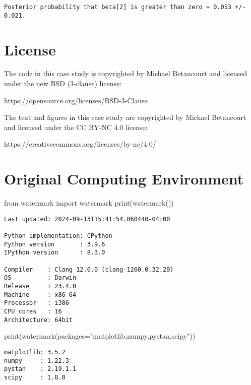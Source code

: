 \documentclass[
  letterpaper,
  DIV=11,
  numbers=noendperiod]{scrartcl}
\newenvironment{Shaded}{\begin{snugshade}}{\end{snugshade}}
\newcommand{\BuiltInTok}[1]{\textcolor[rgb]{0.00,0.23,0.31}{#1}}
\newcommand{\ImportTok}[1]{\textcolor[rgb]{0.00,0.46,0.62}{#1}}
\newcommand{\NormalTok}[1]{\textcolor[rgb]{0.00,0.23,0.31}{#1}}
\newcommand{\OperatorTok}[1]{\textcolor[rgb]{0.37,0.37,0.37}{#1}}
\newcommand{\StringTok}[1]{\textcolor[rgb]{0.13,0.47,0.30}{#1}}
\begin{document}
\begin{verbatim}
Posterior probability that beta[2] is greater than zero = 0.053 +/- 0.021.
\end{verbatim}

\section*{License}\label{license}

The code in this case study is copyrighted by Michael Betancourt and
licensed under the new BSD (3-clause) license:

https://opensource.org/licenses/BSD-3-Clause

The text and figures in this case study are copyrighted by Michael
Betancourt and licensed under the CC BY-NC 4.0 license:

https://creativecommons.org/licenses/by-nc/4.0/

\section*{Original Computing
Environment}\label{original-computing-environment}

\begin{Shaded}
\begin{Highlighting}[]
\ImportTok{from}\NormalTok{ watermark }\ImportTok{import}\NormalTok{ watermark}
\BuiltInTok{print}\NormalTok{(watermark())}
\end{Highlighting}
\end{Shaded}

\begin{verbatim}
Last updated: 2024-09-13T15:41:54.060440-04:00

Python implementation: CPython
Python version       : 3.9.6
IPython version      : 8.3.0

Compiler    : Clang 12.0.0 (clang-1200.0.32.29)
OS          : Darwin
Release     : 23.4.0
Machine     : x86_64
Processor   : i386
CPU cores   : 16
Architecture: 64bit
\end{verbatim}

\begin{Shaded}
\begin{Highlighting}[]
\BuiltInTok{print}\NormalTok{(watermark(packages}\OperatorTok{=}\StringTok{"matplotlib,numpy,pystan,scipy"}\NormalTok{))}
\end{Highlighting}
\end{Shaded}

\begin{verbatim}
matplotlib: 3.5.2
numpy     : 1.22.3
pystan    : 2.19.1.1
scipy     : 1.8.0
\end{verbatim}
\end{document}

